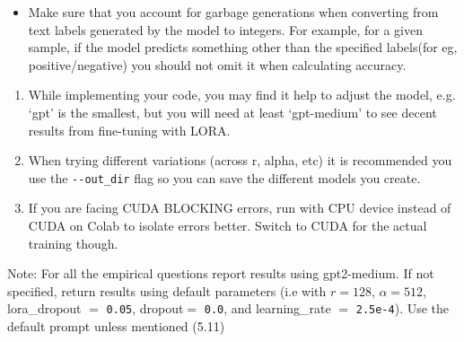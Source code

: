 \documentclass[11pt,addpoints,answers]{exam}
\begin{document}
\begin{questions}
\begin{itemize}
\item Make sure that you account for garbage generations when converting from text labels generated by the model to integers. For example, for a given sample, if the model predicts something other than the specified labels(for eg, positive/negative) you should not omit it when calculating accuracy.
\end{itemize}
    
\begin{enumerate}
    \item While implementing your code, you may find it help to adjust the model, e.g. `gpt' is the smallest, but you will need at least `gpt-medium' to see decent results from fine-tuning with LORA.
    \item When trying different variations (across r, alpha, etc) it is recommended you use the \lstinline{--out_dir} flag so you can save the different models you create. 
    \item If you are facing CUDA BLOCKING errors, run with CPU device instead of CUDA on Colab to isolate errors better. Switch to CUDA for the actual training though. 
\end{enumerate}
\clearpage

Note: For all the empirical questions report results using gpt2-medium. If not specified, return results using default parameters (i.e with $r=128$, $\alpha=512$, lora\_dropout $=$ \lstinline{0.05}, dropout$=$ \lstinline{0.0}, and learning\_rate $=$ \lstinline{2.5e-4}). Use the default prompt unless mentioned (5.11)
\end{questions}
\end{document}
